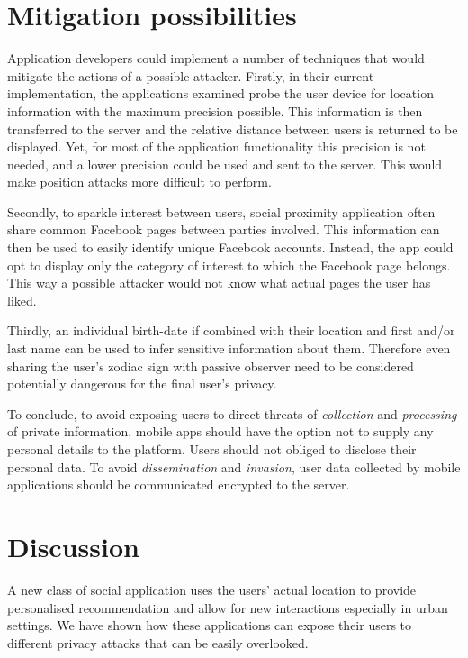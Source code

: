 \section{Mitigation possibilities}

Application developers could implement a number of techniques that would mitigate the actions of a possible attacker. Firstly, in their current implementation, the applications examined probe the user device for location information with the maximum precision possible. This information is then transferred to the server and the relative distance between users is returned to be displayed. Yet, for most of the application functionality this precision is not needed, and a lower precision could be used and sent to the server. This would make position attacks more difficult to perform.

Secondly, to sparkle interest between users, social proximity application often share common Facebook pages between parties involved. This information can then be used to easily identify unique Facebook accounts. Instead, the app could opt to display only the category of interest to which the Facebook page belongs. This way a possible attacker would not know what actual pages the user has liked.

Thirdly, an individual birth-date if combined with their location and first and/or last name can be used to infer sensitive information about them. Therefore even sharing the user's zodiac sign with passive observer need to be considered potentially dangerous for the final user's privacy.

To conclude, to avoid exposing users to direct threats of \emph{collection} and \emph{processing} of private information, mobile apps should have the option not to supply any personal details to the platform. Users should not obliged to disclose their personal data. To avoid \emph{dissemination} and \emph{invasion}, user data collected by mobile applications should be communicated encrypted to the server.

\section{Discussion}

A new class of social application uses the users' actual location to provide personalised recommendation and allow for new interactions especially in urban settings. We have shown how these applications can expose their users to different privacy attacks that can be easily overlooked.

